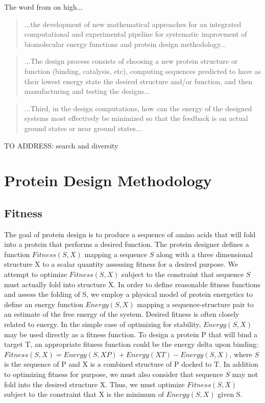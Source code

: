 \documentclass{article}
\begin{document}
The word from on high...

\begin{quote}
...the development of new mathematical approaches for an integrated computational and experimental pipeline for systematic improvment of biomolecular energy functions and protein design methodology...
\end{quote}

\begin{quote}
...The design process consists of choosing a new protein structure or function (binding, catalysis, etc), computing sequences predicted to have as their lowest energy state the desired structure and/or function, and then manufacturing and testing the designs...
\end{quote}

\begin{quote}
...Third, in the design computations, how can the energy of the designed systems most effectively be minimized so that the feedback is on actual ground states or near ground states...
\end{quote}


TO ADDRESS: search and diversity

\section{Protein Design Methodology}

\subsection{Fitness}\label{fitness}

The goal of protein design is to produce a sequence of amino acids that will
fold into a protein that performs a desired function. The protein designer
defines a function $Fitness(S,X)$ mapping a sequence $S$ along with a three
dimensional structure X to a scalar quantity assessing fitness for a desired
purpose. We attempt to optimize $Fitness(S,X)$ subject to the constraint that
sequence $S$ must actually fold into structure X. In order to define reasonable
fitness functions and assess the folding of S, we employ a physical model of
protein energetics to define an energy function $Energy(S,X)$ mapping a
sequence-structure pair to an estimate of the free energy of the system. Desired
fitness is often closely related to energy. In the simple case of optimizing for
stability, $Energy(S,X)$ may be used directly as a fitness function. To design a
protein P that will bind a target T, an appropriate fitness function could be
the energy delta upon binding: $Fitness(S,X) = Energy(S,XP) + Energy(XT) -
Energy(S,X)$, where $S$ is the sequence of P and X is a combined structure of P docked to
T. In addition to optimizing fitness for purpose, we must also consider that
sequence $S$ may not fold into the desired structure X. Thus, we must optimize
$Fitness(S,X)$ subject to the constraint that X is the minimum of $Energy(S,X)$
given S.
\end{document}
